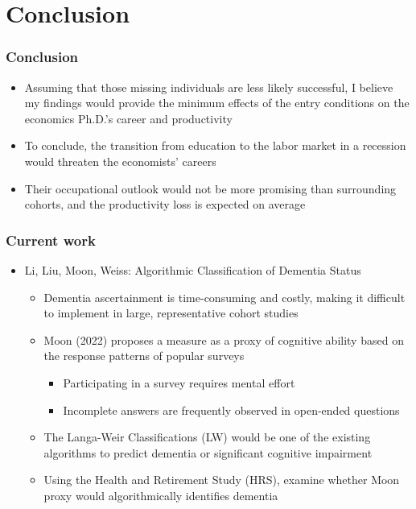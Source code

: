 \documentclass[10pt,svgnames,fragile]{beamer}
\begin{document}
{
	\AtBeginSection{}

\section{Conclusion}
\begin{frame}
	\frametitle{Conclusion}
	\begin{itemize}

	\vfill
		\item Assuming that those missing individuals are less likely successful, I believe my findings would provide 	the minimum effects of the entry conditions on the economics Ph.D.'s career and productivity
		\vfill
		\item To conclude, the transition from education to the labor market in a recession would threaten the economists' careers
		\vfill
		\item Their occupational outlook would not be more 		promising than surrounding cohorts, and the productivity loss is expected on average
\vfill	
\end{itemize}
\end{frame}





\begin{frame}
	\frametitle{Current work}
	\begin{itemize}
		\item Li, Liu, Moon, Weiss: Algorithmic Classification of Dementia Status 
			\vspace{3 mm}
		\begin{itemize}
			\item Dementia ascertainment is time-consuming and costly, making it difficult to implement in large, representative cohort studies
		\vspace{3 mm}
			\item Moon (2022) proposes a measure as a proxy of cognitive ability based on the response patterns of popular surveys
			\begin{itemize}
				\vspace{2 mm}
			\item Participating in a survey requires mental effort
				\vspace{3 mm}
				\item Incomplete answers are frequently observed in open-ended questions
				\vspace{3 mm}
					\end{itemize}
				\item The Langa-Weir Classifications (LW) would be one of the existing algorithms to predict dementia or significant cognitive impairment
				\vfill
				\item Using the Health and Retirement Study (HRS), examine whether Moon proxy would algorithmically identifies dementia
		\end{itemize}
			
		

	\end{itemize}
\end{frame}
}
\end{document}
